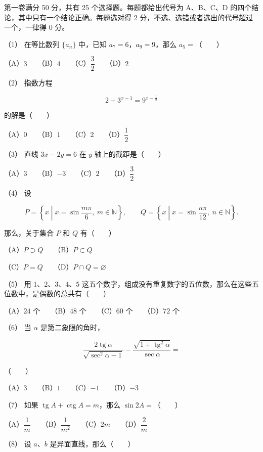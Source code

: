 \begin{question}

第一卷满分 50 分，共有 25 个选择题。每题都给出代号为 A、B、C、D 的四个结论，其中只有一个结论正确。每题选对得 2 分，不选、选错或者选出的代号超过一个，一律得 0 分。

（1） 在等比数列 $\{a_n\}$ 中，已知 $a_7=6$，$a_9=9$，那么 $a_5=$\mbox{（　　）}

（A）$3$　　（B）$4$　　（C）$\dfrac32$　　（D）$2$

（2） 指数方程

\nopagebreak[4]
\[
2+3^{x-1}=9^{x-\frac12}
\]

的解是\mbox{（　　）}

（A）$0$　　（B）$1$　　（C）$2$　　（D）$\dfrac12$

（3） 直线 $3x-2y=6$ 在 $y$ 轴上的截距是\mbox{（　　）}

（A）$3$　　（B）$-3$　　（C）$2$　　（D）$\dfrac32$

（4） 设

\nopagebreak[4]
\[
P=\left\{x\mathrel{}\middle|\mathrel{}x=\sin\frac{m\pi}{6},\ m\in\mathbb N\right\},\qquad
Q=\left\{x\mathrel{}\middle|\mathrel{}x=\sin\frac{n\pi}{12},\ n\in\mathbb N\right\}.
\]

那么，关于集合 $P$ 和 $Q$ 有\mbox{（　　）}

（A）$P\supset Q$　　（B）$P\subset Q$

（C）$P=Q$　　（D）$P\cap Q=\varnothing$

（5） 用 $1\text{、}2\text{、}3\text{、}4\text{、}5$ 这五个数字，组成没有重复数字的五位数，那么在这些五位数中，是偶数的总共有\mbox{（　　）}

（A）$24$ 个　　（B）$48$ 个　　（C）$60$ 个　　（D）$72$ 个

（6） 当 $\alpha$ 是第二象限的角时，

\nopagebreak[4]
\[
\frac{2\operatorname{tg}\alpha}{\sqrt{\operatorname{sec}^2\alpha-1}}
-\frac{\sqrt{1+\operatorname{tg}^2\alpha}}{\operatorname{sec}\alpha}=
\]

\mbox{（　　）}

（A）$3$　　（B）$1$　　（C）$-1$　　（D）$-3$

（7） 如果 $\operatorname{tg}A+\operatorname{ctg}A=m$，那么 $\sin2A=$\mbox{（　　）}

（A）$\dfrac1m$　　（B）$\dfrac1{m^2}$　　（C）$2m$　　（D）$\dfrac2m$

（8） 设 $a\text{、}b$ 是异面直线，那么\mbox{（　　）}


\end{question}
